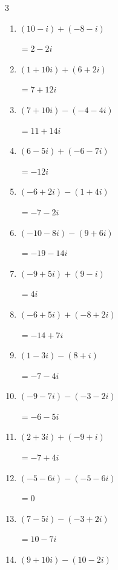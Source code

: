 \begin{multicols}{3}
\begin{enumerate}
  \item $\displaystyle (10-i) + (-8-i)$

        $\displaystyle =2-2i$

  \item $\displaystyle (1+10i) + (6+2i)$

        $\displaystyle =7+12i$

  \item $\displaystyle (7+10i) - (-4-4i)$

        $\displaystyle =11+14i$

  \item $\displaystyle (6-5i) + (-6-7i)$

        $\displaystyle =-12i$

  \item $\displaystyle (-6+2i) - (1+4i)$

        $\displaystyle =-7-2i$

  \item $\displaystyle (-10-8i) - (9+6i)$

        $\displaystyle =-19-14i$

  \item $\displaystyle (-9+5i) + (9-i)$

        $\displaystyle =4i$

  \item $\displaystyle (-6+5i) + (-8+2i)$

        $\displaystyle =-14+7i$

  \item $\displaystyle (1-3i) - (8+i)$

        $\displaystyle =-7-4i$

  \item $\displaystyle (-9-7i) - (-3-2i)$

        $\displaystyle =-6-5i$

  \item $\displaystyle (2+3i) + (-9+i)$

        $\displaystyle =-7+4i$

  \item $\displaystyle (-5-6i) - (-5-6i)$

        $\displaystyle =0$

  \item $\displaystyle (7-5i) - (-3+2i)$

        $\displaystyle =10-7i$

  \item $\displaystyle (9+10i) - (10-2i)$


\end{enumerate}
\end{multicols}

